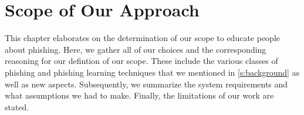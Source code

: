 \section{Scope of Our Approach}
\label{s:assumptions}
This chapter elaborates on the determination of our scope to educate people about phishing. 
Here, we gather all of our choices and the corresponding reasoning for our defintion of our scope. 
These include the various classes of phishing and phishing learning techniques that we mentioned in \autoref{s:background} as well as new aspects.
Subsequently, we summarize the system requirements and what assumptions we had to make. 
Finally, the limitations of our work are stated.

